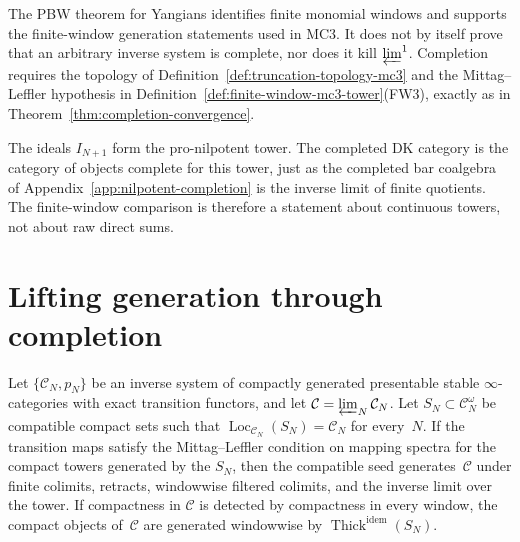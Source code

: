 \begin{remark}
\label{rem:pbw-usage}
The PBW theorem for Yangians identifies finite monomial windows and
supports the finite-window generation statements used in MC3.  It does
not by itself prove that an arbitrary inverse system is complete, nor
does it kill $\varprojlim^1$.  Completion requires the topology of
Definition~\ref{def:truncation-topology-mc3} and the
Mittag--Leffler hypothesis in
Definition~\ref{def:finite-window-mc3-tower}(FW3), exactly as in
Theorem~\ref{thm:completion-convergence}.
\end{remark}

\begin{remark}
\label{rem:francis-gaitsgory-comparison}
The ideals $I_{N+1}$ form the pro-nilpotent tower.  The completed DK
category is the category of objects complete for this tower, just as
the completed bar coalgebra of Appendix~\ref{app:nilpotent-completion}
is the inverse limit of finite quotients.  The finite-window
comparison is therefore a statement about continuous towers, not about
raw direct sums.
\end{remark}

\section{Lifting generation through completion}
\label{sec:lifting-thick-generation}

\begin{lemma}
\label{lem:dense-thick-generation-lifting}
%
Let $\{\mathcal C_N,p_N\}$ be an inverse system of compactly generated
presentable stable $\infty$-categories with exact transition functors,
and let
$\mathcal C=\varprojlim_N\mathcal C_N$.  Let
$S_N\subset\mathcal C_N^\omega$ be compatible compact sets such that
$\operatorname{Loc}_{\mathcal C_N}(S_N)=\mathcal C_N$ for every~$N$.
If the transition maps satisfy the Mittag--Leffler condition on
mapping spectra for the compact towers generated by the $S_N$, then
the compatible seed generates~$\mathcal C$ under finite colimits,
retracts, windowwise filtered colimits, and the inverse limit over
the tower.  If compactness in $\mathcal C$ is detected by compactness
in every window, the compact objects of~$\mathcal C$ are generated
windowwise by $\operatorname{Thick}^{\mathrm{idem}}(S_N)$.
\end{lemma}


